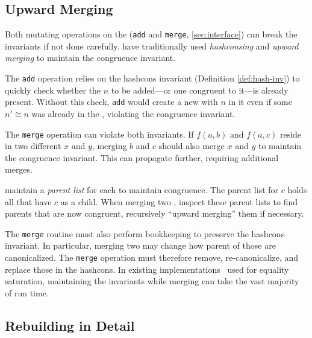 \subsection{Upward Merging}
\label{sec:upward}

Both mutating operations on the \egraph
  (\texttt{add} and \texttt{merge}, \autoref{sec:interface})
  can break the \egraph invariants if not done carefully.
\Egraphs have traditionally used \textit{hashconsing} and
  \textit{upward merging} to maintain the congruence invariant.

The \texttt{add} operation relies on the hashcons invariant
  (Definition \ref{def:hash-inv})
  to quickly check whether the \enode $n$ to be added---or one congruent to it---is
  already present.
Without this check, \texttt{add} would create a new \eclass with $n$ in it
  even if some $n' \cong n$ was already in the \egraph,
  violating the congruence invariant.

The \texttt{merge} operation \eclasses can violate both \egraph invariants.
If $f(a, b)$ and $f(a, c)$ reside in two different \eclasses $x$ and $y$,
  merging $b$ and $c$ should also merge $x$ and $y$ to maintain the congruence invariant.
This can propagate further, requiring additional merges.


\Egraphs maintain a \textit{parent list} for each \eclass
  to maintain congruence.
The parent list for \eclass $c$ holds all \enodes that have $c$ as a child.
When merging two \eclasses, \egraphs inspect these parent lists to find parents
  that are now congruent, recursively ``upward merging'' them if necessary.

The \texttt{merge} routine must also perform bookkeeping to preserve the
  hashcons invariant.
In particular, merging two \eclasses may change how parent \enodes of those
  \eclasses are canonicalized.
The \texttt{merge} operation must therefore
  remove, re-canonicalize, and replace those \enodes in the
  hashcons.
In existing \egraph implementations~\cite{herbie} used for equality saturation,
  maintaining the invariants while merging can take the vast majority of
  run time.

\subsection{Rebuilding in Detail}
\label{sec:rebuilding-detail}

